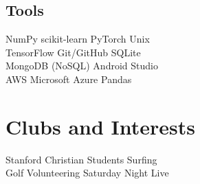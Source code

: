 \documentclass[]{deedy-resume-openfont}
\begin{document}
\begin{minipage}[t]{0.33\textwidth}
\subsection{Tools}
NumPy \textbullet{} scikit-learn \textbullet{} PyTorch \textbullet{} Unix \\
TensorFlow \textbullet{} Git/GitHub \textbullet{} SQLite \\
MongoDB (NoSQL) \textbullet{} Android Studio \\
AWS \textbullet{} Microsoft Azure \textbullet{} Pandas
\sectionsep


\section{Clubs and Interests}
Stanford Christian Students \textbullet{} Surfing \\
Golf \textbullet{} Volunteering \textbullet{} Saturday Night Live



%
%

\end{minipage} 
\hfill
\end{document}
